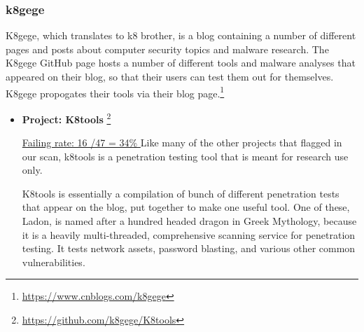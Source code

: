 \documentclass[]{acmart}
\begin{document}
\subsubsection{k8gege}
K8gege, which translates to k8 brother, is a blog containing a number of different pages and posts about computer security topics and malware research. The K8gege GitHub page hosts a number of different tools and malware analyses that appeared on their blog, so that their users can test them out for themselves. K8gege propogates their tools via their blog page.\footnote{\url{https://www.cnblogs.com/k8gege}}
\begin{itemize}
    \item { \bf Project: K8tools }\footnote{\url{https://github.com/k8gege/K8tools}}
    
    \underline{ Failing rate: 16 /47 = 34\% }
Like many of the other projects that flagged in our scan, k8tools is a penetration testing tool that is meant for research use only. 

K8tools is essentially a compilation of bunch of different penetration tests that appear on the blog, put together to make one useful tool. One of these, Ladon, is named after a hundred headed dragon in Greek Mythology, because it is a heavily multi-threaded, comprehensive scanning service for penetration testing. It tests network assets, password blasting, and various other common vulnerabilities.
\end{itemize}
\end{document}
